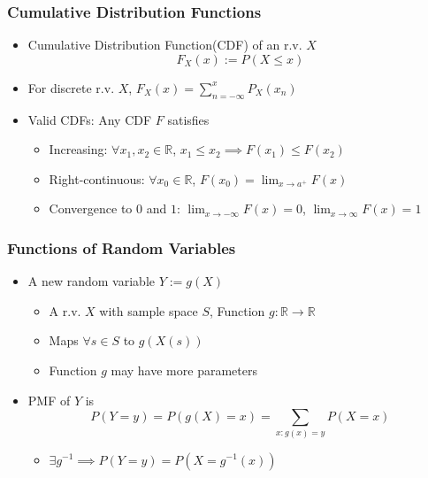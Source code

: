 \subsubsection*{Cumulative Distribution Functions}
\begin{itemize}
    \item Cumulative Distribution Function(CDF) of an r.v. $X$
    \begin{equation}
        F_X(x):=P(X\leq x)
    \end{equation}
    \item For discrete r.v. $X$, $F_X(x)=\sum_{n=-\infty}^{x}P_X(x_n)$
    \item Valid CDFs: Any CDF $F$ satisfies
    \begin{itemize}
        \item Increasing: $\forall x_1,x_2\in\mathbb{R}$, $x_1\leq x_2\implies F(x_1)\leq F(x_2)$
        \item Right-continuous: $\forall x_0\in\mathbb{R}$, $F(x_0)=\lim_{x\to a^+}F(x)$
        \item Convergence to $0$ and $1$: $\lim_{x\to-\infty}F(x)=0$, $\lim_{x\to\infty}F(x)=1$
    \end{itemize}
\end{itemize}

\subsubsection*{Functions of Random Variables}
\begin{itemize}
    \item A new random variable $Y:=g(X)$
    \begin{itemize}
        \item A r.v. $X$ with sample space $S$, Function $g:\mathbb{R}\to\mathbb{R}$
        \item Maps $\forall s\in S$ to $g(X(s))$
        \item Function $g$ may have more parameters
    \end{itemize}
    \item PMF of $Y$ is
    \begin{equation}
        P(Y=y)=P(g(X)=x)=\sum_{x:g(x)=y}P(X=x)
    \end{equation}
    \begin{itemize}
        \item $\exists g^{-1}\implies P(Y=y)=P(X=g^{-1}(x))$
    \end{itemize}
\end{itemize}

